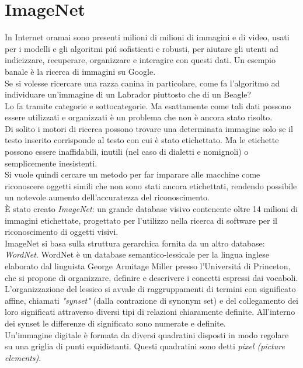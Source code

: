 \documentclass[a4paper,12pt]{report}
\begin{document}
\section{ImageNet}\label{ImageNet}
In Internet oramai sono presenti milioni di milioni di immagini e di video, usati per i modelli e gli algoritmi pi\'{u} sofisticati e robusti, per aiutare gli utenti ad indicizzare, recuperare, organizzare e interagire con questi dati.
Un esempio banale \`e la ricerca di immagini su Google.\\
Se si volesse ricercare una razza canina in particolare, come fa l'algoritmo ad individuare un'immagine di un Labrador piuttosto che di un Beagle?\\
Lo fa tramite categorie e sottocategorie. Ma esattamente come tali dati possono essere utilizzati e organizzati \`e un problema che non \`e ancora stato risolto.\\
Di solito i motori di ricerca possono trovare una determinata immagine solo se il testo inserito corrisponde al testo con cui \`e stato etichettato. Ma le etichette possono essere inaffidabili, inutili (nel caso di dialetti e nomignoli) o semplicemente inesistenti.\\
Si vuole quindi cercare un metodo per far imparare alle macchine come riconoscere oggetti simili che non sono stati ancora etichettati, rendendo possibile un notevole aumento dell'accuratezza del riconoscimento.\\
\`{E} stato creato \textit{ImageNet}: un grande database visivo contenente oltre 14 milioni di immagini etichettate, progettato per l'utilizzo nella ricerca di software per il riconoscimento di oggetti visivi.\\
ImageNet si basa sulla struttura gerarchica fornita da un altro database: \textit{WordNet}. WordNet \`e un database semantico-lessicale per la lingua inglese elaborato dal linguista George Armitage Miller presso l'Universit\'{a} di Princeton, che si propone di organizzare, definire e descrivere i concetti espressi dai vocaboli. L'organizzazione del lessico si avvale di raggruppamenti di termini con significato affine, chiamati \textit{"synset"} (dalla contrazione di synonym set) e del collegamento dei loro significati attraverso diversi tipi di relazioni chiaramente definite. All'interno dei synset le differenze di significato sono numerate e definite.\cite{wordnet}\\
Un'immagine digitale \`e formata da diversi quadratini disposti in modo regolare su una griglia di punti equidistanti. Questi quadratini sono detti \textit{pixel (picture elements)}.\\
\end{document}
